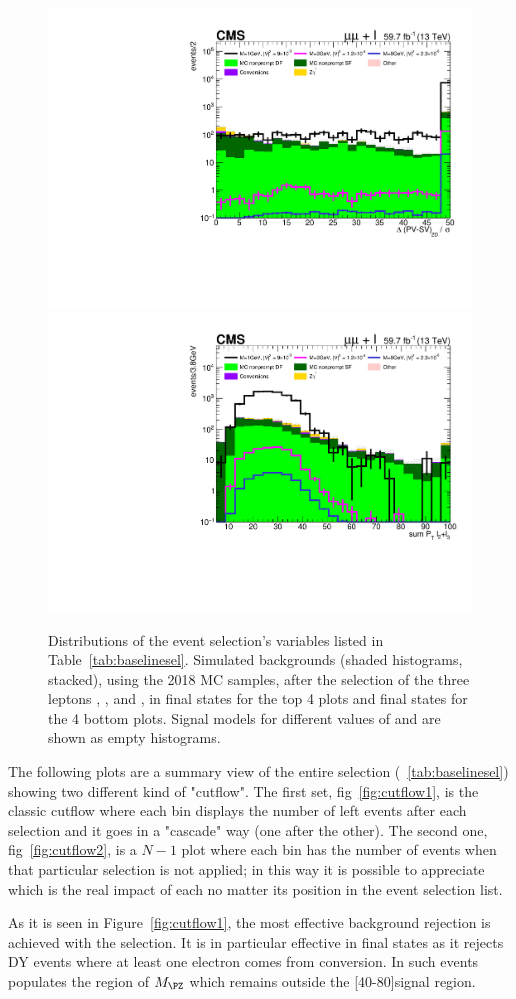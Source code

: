\begin{figure}[h]
  \includegraphics[clip,trim=0.9cm 0.7cm 0.7cm 0.6cm,width=.35\textwidth]{Figures/c6/selection/18/mu_sigmaDeltaPV_SV_2D__0.pdf}
  \includegraphics[clip,trim=0.9cm 0.7cm 0.7cm 0.6cm,width=.35\textwidth]{Figures/c6/selection/18/mu_sum_Pt_L2L3__0.pdf}
  \caption{Distributions of the event selection's variables listed in
    Table~\ref{tab:baselinesel}. Simulated backgrounds (shaded histograms, stacked),
    using the 2018 MC samples, 
    after the selection of the three leptons \lone, \ltwo, and \lthree,
    in \eex final states for the top 4 plots and \mmx final states for
    the 4 bottom plots.
    Signal models for different values of \mhnl and \mixpar are shown
    as empty histograms.}
  \label{fig:selection_electrons}
\end{figure}


\clearpage
The following plots are a summary view of the entire selection
(~\ref{tab:baselinesel}) showing two different kind of "cutflow". The
first set, fig~\ref{fig:cutflow1}, is the classic cutflow where each
bin displays the number of left events after each selection and it goes in a
"cascade" way (one after the other). The second one,
fig~\ref{fig:cutflow2}, is a $N-1$ plot where each bin has the number
of events when that particular selection is not applied; in this way it is
possible to appreciate which is the real impact of each no matter
its position in the event selection list. 

As it is seen in Figure~\ref{fig:cutflow1}, the most effective
background rejection is achieved with the \mthreel selection. It is in
particular effective in \eex final states as it rejects DY events
where at least one electron comes from conversion. In such events
\mthreel populates the region of $M_{\PZ}$ which remains outside the
[40-80]\GeV signal region.

